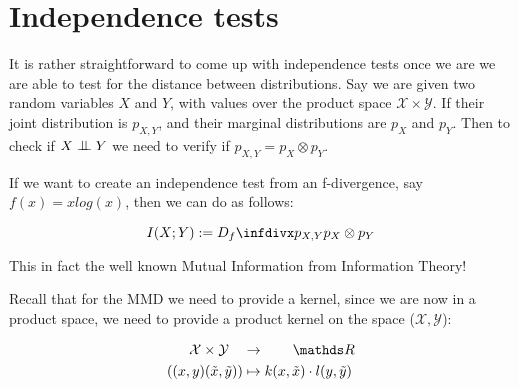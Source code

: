 





\section{Independence tests}

It is rather straightforward to come up with independence tests once we are we are able to test 
for the distance between distributions. Say we are given two random variables $X$ and $Y$, with 
values over the product space $\mathcal{X} \times \mathcal{Y}$. If their joint distribution is 
$p_{X, Y}$, and their marginal distributions are $p_X$ and $p_Y$. Then to check if $X \bigCI Y$
we need to verify if $p_{X, Y} = p_X \otimes p_Y$.

If we want to create an independence test from an f-divergence, say $f(x) = xlog(x)$, then we 
can do as follows:

$$
    I (X; Y) :=  \infdiv{p_{X, Y}}{p_X \otimes p_Y}
$$

This in fact the well known Mutual Information from Information Theory! 

Recall that for the MMD we need to provide a kernel, since we are now in a product space, we need 
to provide a product kernel on the space ($\mathcal{X}, \mathcal{Y}$):

\begin{align*}
    \mathcal{X} \times \mathcal{Y} \quad &\rightarrow \qquad \R \\
    ( (x, y) (\tilde{x}, \tilde{y})) &\mapsto k(x, \tilde{x}) \cdot l(y, \tilde{y})
\end{align*}

